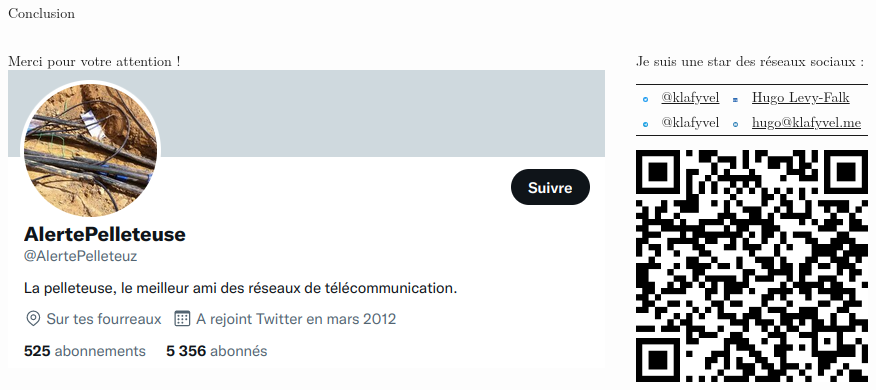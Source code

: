 \documentclass[aspectratio=149, 10pt, t]{beamer}
\begin{document}
\begin{frame}{Conclusion}
    \begin{columns}
        \begin{column}{0.4\linewidth}
            \vspace{0.3cm}
            \medskip
            {\huge Merci pour votre attention !}
            \medskip
            \vspace{1cm}
            \includegraphics[width=\linewidth]{images/alerte_pelleteuse}
        \end{column}
        \begin{column}{0.6\linewidth}
            \centering
            \vspace{0.2cm}
            \alert{Je suis une star des réseaux sociaux :}
            \vspace{0.7cm}
            \begin{tabular}{rl|rl}
                \includegraphics[width=0.5cm]{images/twitter} & \href{https://twitter.com/klafyvel}{@klafyvel} & \includegraphics[width=0.5cm]{images/linkedin} & \href{https://www.linkedin.com/in/hugo-levy-falk/}{Hugo Levy-Falk}\\
                \includegraphics[width=0.5cm]{images/telegram} & @klafyvel & \includegraphics[width=0.5cm]{images/mail} & \href{mailto:hugo@klafyvel.me}{hugo@klafyvel.me}
            \end{tabular}
            \includegraphics[width=0.5\linewidth]{images/qrcode}

\end{column}
\end{columns}
\end{frame}
\end{document}
